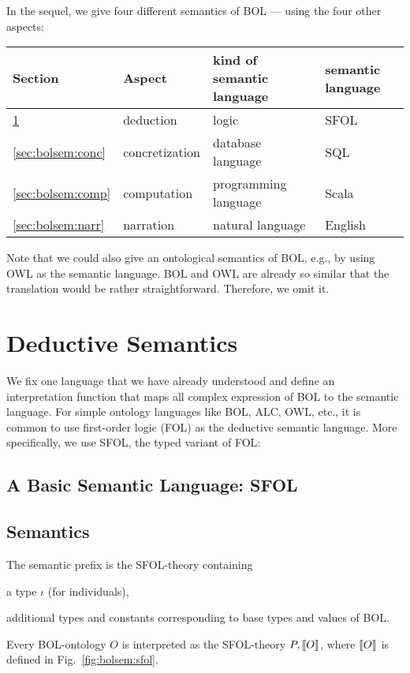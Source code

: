 In the sequel, we give four different semantics of BOL --- using the four other aspects:
\begin{center}
\begin{tabular}{llll}
Section & Aspect & kind of semantic language & semantic language\\
\hline
\ref{sec:bolsem:ded} & deduction & logic & SFOL \\
\ref{sec:bolsem:conc} & concretization & database language & SQL \\
\ref{sec:bolsem:comp} & computation & programming language & Scala \\
\ref{sec:bolsem:narr} & narration & natural language & English \\
\end{tabular}
\end{center}

Note that we could also give an ontological semantics of BOL, e.g., by using OWL as the semantic language.
BOL and OWL are already so similar that the translation would be rather straightforward.
Therefore, we omit it.

\section{Deductive Semantics}\label{sec:bolsem:ded}

We fix one language that we have already understood and define an interpretation function that maps all complex expression of BOL to the semantic language.
For simple ontology languages like BOL, ALC, OWL, etc., it is common to use first-order logic (FOL) as the deductive semantic language.
More specifically, we use SFOL, the typed variant of FOL:

\subsection{A Basic Semantic Language: SFOL}\label{sec:wuv:tfol}
  

\subsection{Semantics}

\begin{definition}\label{def:bolsem:sfol}
The semantic prefix is the SFOL-theory containing
\begin{compactitem}
 \item a type $\iota$ (for individuals),
 \item additional types and constants corresponding to base types and values of BOL.
\end{compactitem}

Every BOL-ontology $O$ is interpreted as the SFOL-theory $P,\llbracket O\rrbracket$, where $\llbracket O\rrbracket$ is defined in Fig.~\ref{fig:bolsem:sfol}.
\end{definition}

